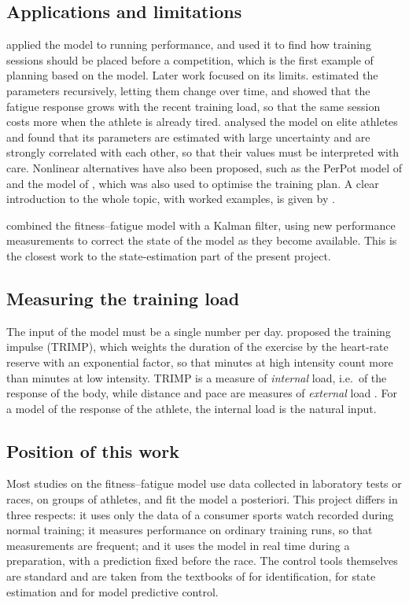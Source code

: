 \documentclass[11pt,a4paper]{article}
\begin{document}
\subsection{Applications and limitations}
\citet{morton1990} applied the model to running performance, and
\citet{fitzclarke1991} used it to find how training sessions should be placed
before a competition, which is the first example of planning based on the
model. Later work focused on its limits. \citet{busso1997} estimated the
parameters recursively, letting them change over time, and \citet{busso2003}
showed that the fatigue response grows with the recent training load, so that
the same session costs more when the athlete is already tired.
\citet{hellard2006} analysed the model on elite athletes and found that its
parameters are estimated with large uncertainty and are strongly correlated
with each other, so that their values must be interpreted with care. Nonlinear
alternatives have also been proposed, such as the PerPot model of
\citet{perl2001} and the model of \citet{turner2017}, which was also used to
optimise the training plan. A clear introduction to the whole topic, with
worked examples, is given by \citet{clarke2013}.

\citet{kolossa2017} combined the fitness--fatigue model with a Kalman filter,
using new performance measurements to correct the state of the model as they
become available. This is the closest work to the state-estimation part of the
present project.

\subsection{Measuring the training load}
The input of the model must be a single number per day. \citet{banister1991}
proposed the training impulse (TRIMP), which weights the duration of the
exercise by the heart-rate reserve with an exponential factor, so that minutes
at high intensity count more than minutes at low intensity. TRIMP is a
measure of \emph{internal} load, i.e.\ of the response of the body, while
distance and pace are measures of \emph{external} load \citep{impellizzeri2019}.
For a model of the response of the athlete, the internal load is the natural
input.

\subsection{Position of this work}
Most studies on the fitness--fatigue model use data collected in laboratory
tests or races, on groups of athletes, and fit the model a posteriori. This
project differs in three respects: it uses only the data of a consumer
sports watch recorded during normal training; it measures performance on
ordinary training runs, so that measurements are frequent; and it uses the
model in real time during a preparation, with a prediction fixed before the
race. The control tools themselves are standard and are taken from the
textbooks of \citet{ljung1999} for identification, \citet{simon2006} for
state estimation and \citet{rawlings2017} for model predictive control.
\end{document}
